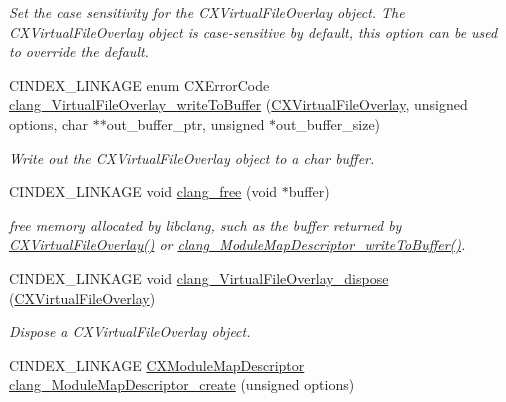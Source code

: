 \begin{DoxyCompactItemize}
\begin{DoxyCompactList}\small\item\em Set the case sensitivity for the {\ttfamily C\+X\+Virtual\+File\+Overlay} object. The {\ttfamily C\+X\+Virtual\+File\+Overlay} object is case-\/sensitive by default, this option can be used to override the default. \end{DoxyCompactList}\item 
C\+I\+N\+D\+E\+X\+\_\+\+L\+I\+N\+K\+A\+GE enum C\+X\+Error\+Code \hyperlink{group__BUILD__SYSTEM_ga10434b45b006d39f861d7b2a04d3e31e}{clang\+\_\+\+Virtual\+File\+Overlay\+\_\+write\+To\+Buffer} (\hyperlink{group__BUILD__SYSTEM_gae854e36ceb0a02071e557e19f908772d}{C\+X\+Virtual\+File\+Overlay}, unsigned options, char $\ast$$\ast$out\+\_\+buffer\+\_\+ptr, unsigned $\ast$out\+\_\+buffer\+\_\+size)
\begin{DoxyCompactList}\small\item\em Write out the {\ttfamily C\+X\+Virtual\+File\+Overlay} object to a char buffer. \end{DoxyCompactList}\item 
C\+I\+N\+D\+E\+X\+\_\+\+L\+I\+N\+K\+A\+GE void \hyperlink{group__BUILD__SYSTEM_ga3d7fcaba04ff8fcc4882e1bab6dcbee8}{clang\+\_\+free} (void $\ast$buffer)
\begin{DoxyCompactList}\small\item\em free memory allocated by libclang, such as the buffer returned by {\ttfamily \hyperlink{group__BUILD__SYSTEM_gae854e36ceb0a02071e557e19f908772d}{C\+X\+Virtual\+File\+Overlay()}} or {\ttfamily \hyperlink{group__BUILD__SYSTEM_gacaeaf475a29b16a041641b6ebe9a012d}{clang\+\_\+\+Module\+Map\+Descriptor\+\_\+write\+To\+Buffer()}}. \end{DoxyCompactList}\item 
\mbox{\label{group__BUILD__SYSTEM_ga118f45b2f96f989fc1f39f3f95973deb}} 
C\+I\+N\+D\+E\+X\+\_\+\+L\+I\+N\+K\+A\+GE void \hyperlink{group__BUILD__SYSTEM_ga118f45b2f96f989fc1f39f3f95973deb}{clang\+\_\+\+Virtual\+File\+Overlay\+\_\+dispose} (\hyperlink{group__BUILD__SYSTEM_gae854e36ceb0a02071e557e19f908772d}{C\+X\+Virtual\+File\+Overlay})
\begin{DoxyCompactList}\small\item\em Dispose a {\ttfamily C\+X\+Virtual\+File\+Overlay} object. \end{DoxyCompactList}\item 
C\+I\+N\+D\+E\+X\+\_\+\+L\+I\+N\+K\+A\+GE \hyperlink{group__BUILD__SYSTEM_ga8d7eea7855a8d1118218c7661469b3db}{C\+X\+Module\+Map\+Descriptor} \hyperlink{group__BUILD__SYSTEM_ga41bcb2ce427f6892d48bc21117b22274}{clang\+\_\+\+Module\+Map\+Descriptor\+\_\+create} (unsigned options)
$$
\end{DoxyCompactItemize}

